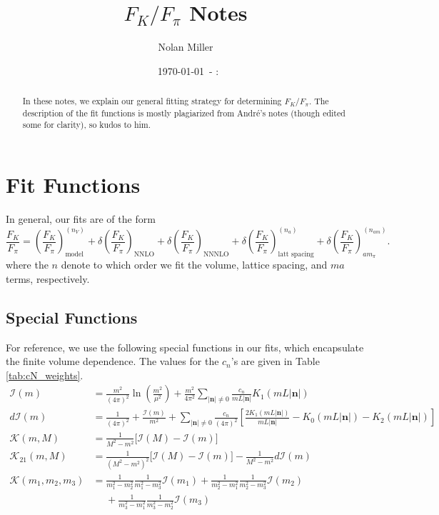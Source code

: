 \documentclass[prd,tightenlines,preprintnumbers,showpacs,superscriptaddress,notitlepage,nofootinbib,eqsecnum,floatfix,notitlepage]{revtex4-1}
\newcommand{\mydate}{\ \today \ - \number\hour :\number\minute}
\begin{document}
	
\title{$F_K / F_\pi$ Notes}
\author{Nolan Miller}
\date{\mydate}


\begin{abstract}
In these notes, we explain our general fitting strategy for determining $F_K / F_\pi$. The description of the fit functions is mostly plagiarized from André's notes (though edited some for clarity), so kudos to him.
\end{abstract}
\maketitle


\section{Fit Functions}

In general, our fits are of the form
\begin{equation}
\frac{F_K}{F_\pi} = \left(\frac{F_K}{F_\pi}\right)_\text{model}^{(n_V)} + 
\delta\left(\frac{F_K}{F_\pi}\right)_\text{NNLO} + 
\delta\left(\frac{F_K}{F_\pi}\right)_\text{NNNLO} + 
\delta\left(\frac{F_K}{F_\pi}\right)_\text{latt spacing}^{(n_a)} + 
\delta\left(\frac{F_K}{F_\pi}\right)_{am_\pi}^{(n_{am})}.
\end{equation}
where the $n$ denote to which order we fit the volume, lattice spacing, and $ma$ terms, respectively.

\subsection{Special Functions}
For reference, we use the following special functions in our fits, which encapsulate the finite volume dependence. The values for the $c_n$'s are given in Table \ref{tab:cN_weights}.
\begin{align}
\mathcal{I}(m) &= \frac{m^2}{(4\pi)^2} \ln \left( \frac{m^2}{\mu^2} \right)
+ \frac{m^2}{4\pi^2} \sum_{|\mathbf{n}|\neq0} \frac{c_n}{mL|\mathbf{n}|} K_1(mL|\mathbf{n}|) \\
d\mathcal{I}(m) &=
\frac{1}{(4\pi)^2} + \frac{\mathcal{I}(m)}{m^2}
+\sum_{|\mathbf{n}|\neq0} \frac{c_n}{(4\pi)^2} \left[
\frac{2K_1(mL|\mathbf{n}|)}{mL|\mathbf{n}|}
-K_0(mL|\mathbf{n}|)
-K_2(mL|\mathbf{n}|)\right] \\
\mathcal{K}(m,M) &= \frac{1}{M^2 - m^2} \Big[ \mathcal{I}(M) - \mathcal{I}(m) \Big] \\
\mathcal{K}_{21}(m,M) &=
\frac{1}{(M^2 - m^2)^2} \Big[ \mathcal{I}(M) - \mathcal{I}(m) \Big]
-\frac{1}{M^2 - m^2} d\mathcal{I}(m) \\
\mathcal{K}(m_1,m_2,m_3) &= \frac{1}{m_1^2 - m_2^2}\frac{1}{m_1^2-m_3^2} \mathcal{I}(m_1)
+\frac{1}{m_2^2 - m_1^2} \frac{1}{m_2^2 - m_3^2} \mathcal{I}(m_2)
\nonumber\\&\phantom{=}
+\frac{1}{m_3^2 - m_1^2} \frac{1}{m_3^2 - m_2^2} \mathcal{I}(m_3)
\end{align}
\end{document}
